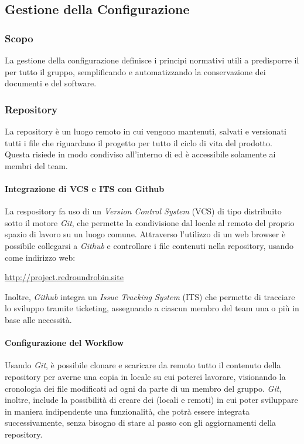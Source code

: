 \subsection{Gestione della Configurazione}

	\subsubsection{Scopo}	

	La gestione della configurazione definisce i principi normativi utili a predisporre il  per tutto il gruppo, semplificando e automatizzando la conservazione dei documenti e del software.

	\subsubsection{Repository}

	La repository è un luogo remoto in cui vengono mantenuti, salvati e versionati tutti i file che riguardano il progetto per tutto il ciclo di vita del prodotto. Questa risiede in modo condiviso all'interno di  ed è accessibile solamente ai membri del team.

		\paragraph{Integrazione di VCS e ITS con Github}

		La respository fa uso di un \textit{Version Control System} (VCS) di tipo distribuito sotto il motore \textit{Git}, che permette la condivisione dal locale al remoto del proprio spazio di lavoro su un luogo comune. Attraverso l'utilizzo di un web browser è possibile collegarsi a \textit{Github} e controllare i file contenuti nella repository, usando come indirizzo web:

		\href{http://project.redroundrobin.site}{http://project.redroundrobin.site} 

		Inoltre, \textit{Github} integra un \textit{Issue Tracking System} (ITS) che permette di tracciare lo sviluppo tramite ticketing, assegnando a ciascun membro del team una o più  in base alle necessità.

		\paragraph{Configurazione del Workflow}

		Usando \textit{Git}, è possibile clonare e scaricare da remoto tutto il contenuto della repository per averne una copia in locale su cui poterci lavorare, visionando la cronologia dei file modificati ad ogni  da parte di un membro del gruppo.
		\textit{Git}, inoltre, include la possibilità di creare dei  (locali e remoti) in cui poter sviluppare in maniera indipendente una funzionalità, che potrà essere integrata successivamente, senza bisogno di stare al passo con gli aggiornamenti della repository.

